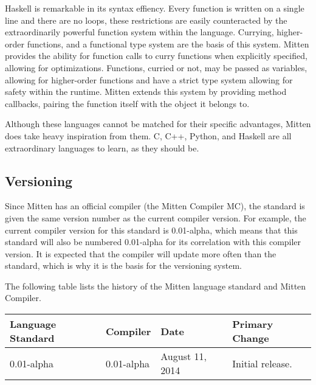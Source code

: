 \documentclass[10pt,a4paper]{article}
\begin{document}
Haskell is remarkable in its syntax effiency. Every function is written on a single line and there are no loops, these restrictions are easily counteracted by the extraordinarily powerful function system within the language. Currying, higher-order functions, and a functional type system are the basis of this system. Mitten provides the ability for function calls to curry functions when explicitly specified, allowing for optimizations. Functions, curried or not, may be passed as variables, allowing for higher-order functions and have a strict type system allowing for safety within the runtime. Mitten extends this system by providing method callbacks, pairing the function itself with the object it belongs to.

Although these languages cannot be matched for their specific advantages, Mitten does take heavy inspiration from them. C, C++, Python, and Haskell are all extraordinary languages to learn, as they should be.

\subsection{Versioning}
\label{sec:Versioning}
Since Mitten has an official compiler (the Mitten Compiler MC), the standard is given the same version number as the current compiler version. For example, the current compiler version for this standard is 0.01-alpha, which means that this standard will also be numbered 0.01-alpha for its correlation with this compiler version. It is expected that the compiler will update more often than the standard, which is why it is the basis for the versioning system.

The following table lists the history of the Mitten language standard and Mitten Compiler. \newline
\begin{tabular}{|l|l|l|l|}
\hline
\textbf{Language Standard} & \textbf{Compiler} & \textbf{Date} & \textbf{Primary Change} \\
\hline
0.01-alpha & 0.01-alpha & August 11, 2014 & Initial release. \\
\hline
\end{tabular}
\end{document}
